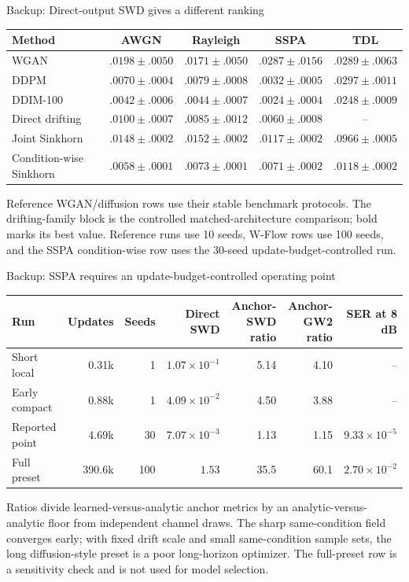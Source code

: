 \documentclass[english,xcolor=dvipsnames,aspectratio=169,10pt]{beamer}
\begin{document}
\begin{frame}{Backup: Direct-output SWD gives a different ranking}
\scriptsize
\centering
\renewcommand{\arraystretch}{1.25}
\begin{tabular}{lcccc}
\toprule
Method & AWGN & Rayleigh & SSPA & TDL\\
\midrule
WGAN & $.0198\pm.0050$ & $.0171\pm.0050$ & $.0287\pm.0156$ & $.0289\pm.0063$\\
DDPM & $.0070\pm.0004$ & $.0079\pm.0008$ & $.0032\pm.0005$ & $.0297\pm.0011$\\
DDIM-100 & $.0042\pm.0006$ & $.0044\pm.0007$ & $.0024\pm.0004$ & $.0248\pm.0009$\\
\midrule
Direct drifting & $.0100\pm.0007$ & $.0085\pm.0012$ & $\mathbf{.0060\pm.0008}$ & --\\
Joint Sinkhorn & $.0148\pm.0002$ & $.0152\pm.0002$ & $.0117\pm.0002$ & $.0966\pm.0005$\\
Condition-wise Sinkhorn & $\mathbf{.0058\pm.0001}$ & $\mathbf{.0073\pm.0001}$ & $.0071\pm.0002$ & $\mathbf{.0118\pm.0002}$\\
\bottomrule
\end{tabular}
\vspace{0.45cm}
\begin{minipage}{0.9\textwidth}
\small Reference WGAN/diffusion rows use their stable benchmark protocols. The drifting-family block is the controlled matched-architecture comparison; bold marks its best value. Reference runs use 10 seeds, W-Flow rows use 100 seeds, and the SSPA condition-wise row uses the 30-seed update-budget-controlled run.
\end{minipage}
\end{frame}

\begin{frame}{Backup: SSPA requires an update-budget-controlled operating point}
\scriptsize
\centering
\renewcommand{\arraystretch}{1.3}
\begin{tabular}{lrrrrrr}
\toprule
Run & Updates & Seeds & Direct SWD & Anchor-SWD ratio & Anchor-GW2 ratio & SER at 8 dB\\
\midrule
Short local & 0.31k & 1 & $1.07\!\times\!10^{-1}$ & 5.14 & 4.10 & --\\
Early compact & 0.88k & 1 & $4.09\!\times\!10^{-2}$ & 4.50 & 3.88 & --\\
Reported point & 4.69k & 30 & $7.07\!\times\!10^{-3}$ & 1.13 & 1.15 & $9.33\!\times\!10^{-5}$\\
Full preset & 390.6k & 100 & $1.53$ & 35.5 & 60.1 & $2.70\!\times\!10^{-2}$\\
\bottomrule
\end{tabular}
\vspace{0.45cm}
\begin{minipage}{0.92\textwidth}
\small Ratios divide learned-versus-analytic anchor metrics by an analytic-versus-analytic floor from independent channel draws. The sharp same-condition field converges early; with fixed drift scale and small same-condition sample sets, the long diffusion-style preset is a poor long-horizon optimizer. The full-preset row is a sensitivity check and is not used for model selection.
\end{minipage}
\end{frame}
\end{document}
